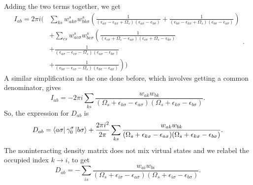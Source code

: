 \documentclass[12pt]{caltech_thesis}
\begin{document}
Adding the two terms together, we get
\begin{equation}
\begin{aligned}
I_{ab} = 2\pi i \Bigg( & \sum_{ks} w_{a k \sigma}^s w_{b k \sigma}^s \left( \frac{1}{(\epsilon_{a \sigma} -\epsilon_{k \sigma}+\Omega_s)(\epsilon_{a \sigma} -\epsilon_{b \sigma})} + \frac{1}{(\epsilon_{b \sigma} -\epsilon_{k \sigma}+\Omega_s)(\epsilon_{b \sigma} -\epsilon_{a \sigma})} \right) \\
& + \sum_{cs} w_{a c \sigma}^s w_{b c \sigma}^s \left( \frac{1}{(\epsilon_{c \sigma} + \Omega_s -\epsilon_{a \sigma})(\epsilon_{c \sigma} + \Omega_s -\epsilon_{b \sigma})} \right. \\
& \left. + \frac{1}{(\epsilon_{a \sigma} -\epsilon_{c \sigma}-\Omega_s)(\epsilon_{a \sigma} -\epsilon_{b \sigma})} \right. \\
& \left. + \frac{1}{(\epsilon_{b \sigma} -\epsilon_{c \sigma}-\Omega_s)(\epsilon_{b \sigma} -\epsilon_{a \sigma})} \right) \Bigg)
\end{aligned}
.
\end{equation}
A similar simplification as the one done before, which involves getting a common denominator, gives
\begin{equation}
I_{ab} = -2\pi i \sum_{ks}\frac{w_{ak} w_{bk}}{(\Omega_s + \epsilon_{k \sigma} - \epsilon_{a \sigma})(\Omega_s + \epsilon_{k \sigma} - \epsilon_{b \sigma})}.
\end{equation}
So, the expression for $D_{ab}$ is
\begin{equation}
D_{ab} = \bra{a\sigma } \gamma _0^\sigma \ket{b\sigma } + \frac{2\pi i^2}{2\pi} \sum_{ks}\frac{w_{ak} w_{bk}}{(\Omega_s + \epsilon_{k \sigma} - \epsilon_{a \sigma})(\Omega_s + \epsilon_{k \sigma} - \epsilon_{b \sigma})}.
\end{equation}
The noninteracting density matrix does not mix virtual states and we relabel the occupied index $k\rightarrow i$, to get
\begin{equation}
D_{ab} = - \sum_{is}\frac{w_{ai} w_{bi}}{(\Omega_s + \epsilon_{i \sigma} - \epsilon_{a \sigma})(\Omega_s + \epsilon_{i \sigma} - \epsilon_{b \sigma})}.
\end{equation}
\end{document}
